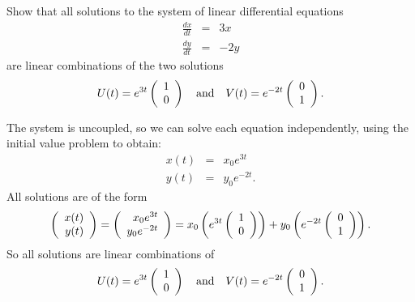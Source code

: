 \documentclass{ximera}
\begin{document}
\begin{exercise} \label{c4.4.4}
Show that all solutions to the system of linear differential equations
\begin{eqnarray*}
\frac{dx}{dt} & = & 3x \\
\frac{dy}{dt} & = & -2y
\end{eqnarray*}
are linear combinations of the two solutions
\[
U(t) = e^{3t}\left(\begin{array}{r} 1 \\ 0\end{array}\right) \quad\mbox{and}\quad V(t) = e^{-2t}\left(\begin{array}{r} 0 \\ 1\end{array}\right).
\]

\begin{solution}

The system is uncoupled, so we can solve each equation
independently, using the initial value problem to obtain:
\[ \begin{array}{rcl}
x(t) & = & x_0e^{3t} \\
y(t) & = & y_0e^{-2t}. \end{array} \]
All solutions are of the form
\[ \left(\begin{array}{r} x(t) \\ y(t)\end{array}\right) = \left(\begin{array}{r} x_0e^{3t} \\ y_0e^{-2t}\end{array}\right)
= x_0\left(e^{3t}\left(\begin{array}{r} 1 \\ 0\end{array}\right)\right) +
y_0\left(e^{-2t}\left(\begin{array}{r} 0 \\ 1\end{array}\right)\right). \]
So all solutions are linear combinations of
\[ 
U(t) = e^{3t}\left(\begin{array}{r} 1 \\ 0\end{array}\right) \quad\mbox{and}\quad V(t) = e^{-2t}\left(\begin{array}{r} 0 \\ 1\end{array}\right). 
\]

\end{solution}
\end{exercise}
\end{document}
